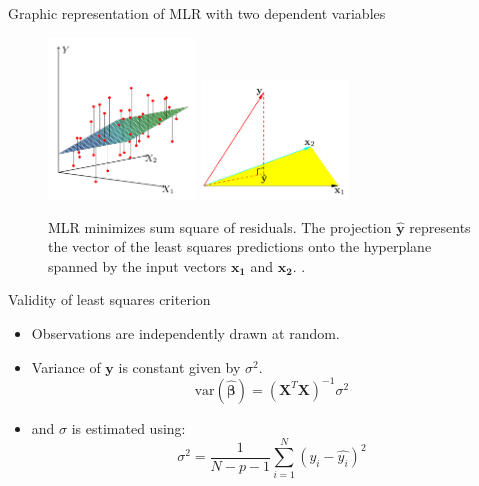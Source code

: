 \documentclass{beamer}
\let \vec \mathbf
\begin{document}
\begin{frame}{Graphic representation of MLR with two dependent variables}
    \begin{figure}
        \centering
        \includegraphics[width=0.35\textwidth]{figures/fig3-1.pdf}
        \includegraphics[width=0.35\textwidth]{figures/fig3-2.pdf}
        \caption{MLR minimizes sum square of residuals. The projection $\vec{\hat{y}}$ represents the vector of the least squares predictions onto the hyperplane spanned by the input vectors $\vec{x_1}$ and $\vec{x_2}$. \cite{hastieElementsStatisticalLearning2016}.}
    \end{figure}
\end{frame}


\begin{frame}{Validity of least squares criterion}
    \begin{itemize}
        \item Observations are independently drawn at random.
        \item Variance of $\vec{y}$ is constant given by $\sigma^2$.
    \begin{equation*}
        \mathrm{var}(\hat{\bm{\beta}}) = (\vec{X}^T \vec{X})^{-1} \sigma^2
    \end{equation*}
    \item and $\sigma$ is estimated using:
    \begin{equation*}
        \sigma^2 = \frac{1}{N-p-1}\sum_{i=1}^N (y_i - \hat{y_i})^2
    \end{equation*}
    \end{itemize}
\end{frame}
\end{document}
